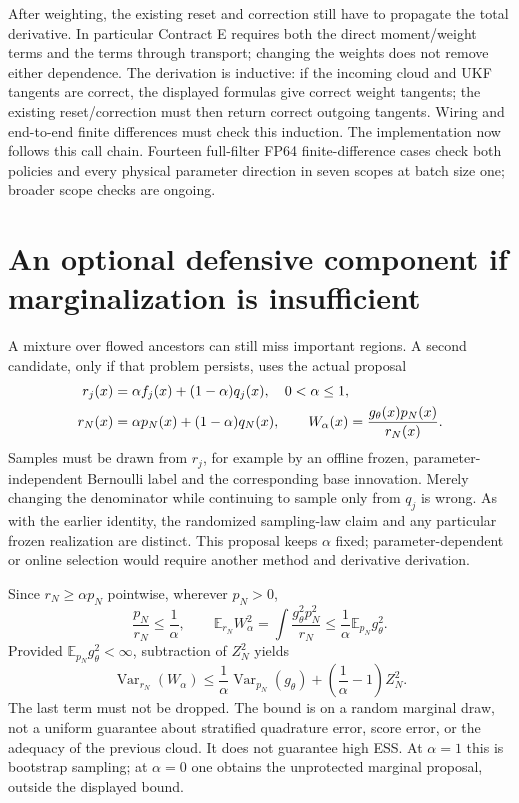 \documentclass[11pt]{article}
\newcommand{\E}{\mathbb E}
\newcommand{\Var}{\operatorname{Var}}
\begin{document}
After weighting, the existing reset and correction still have to propagate
the total derivative. In particular Contract E requires both the direct
moment/weight terms and the terms through transport; changing the weights
does not remove either dependence. The derivation is inductive: if the
incoming cloud and UKF tangents are correct, the displayed formulas give
correct weight tangents; the existing reset/correction must then return
correct outgoing tangents. Wiring and end-to-end finite differences must
check this induction. The implementation now follows this call chain. Fourteen full-filter FP64
finite-difference cases check both policies and every physical parameter
direction in seven scopes at batch size one; broader scope checks are ongoing.

\section{An optional defensive component if marginalization is insufficient}

A mixture over flowed ancestors can still miss important regions. A second
candidate, only if that problem persists, uses the actual proposal
\begin{align}
 r_j(x)&=\alpha f_j(x)+(1-\alpha)q_j(x),\quad 0<\alpha\leq1,\notag\\
 r_N(x)&=\alpha p_N(x)+(1-\alpha)q_N(x),\qquad
 W_\alpha(x)=\frac{g_\theta(x)p_N(x)}{r_N(x)} .
 \label{eq:defensive}
\end{align}
Samples must be drawn from $r_j$, for example by an offline frozen,
parameter-independent Bernoulli label and the corresponding base
innovation. Merely changing the denominator while continuing to sample
only from $q_j$ is wrong. As with the earlier identity, the randomized
sampling-law claim and any particular frozen realization are distinct.
This proposal keeps $\alpha$ fixed; parameter-dependent or online
selection would require another method and derivative derivation.

Since $r_N\geq\alpha p_N$ pointwise, wherever $p_N>0$,
\begin{equation}
 \frac{p_N}{r_N}\leq\frac1\alpha,\qquad
 \E_{r_N}W_\alpha^2
 =\int\frac{g_\theta^2 p_N^2}{r_N}
 \leq\frac1\alpha\E_{p_N}g_\theta^2 .
 \label{eq:defensive-bound}
\end{equation}
Provided $\E_{p_N}g_\theta^2<\infty$, subtraction of $Z_N^2$ yields
\begin{equation}
 \Var_{r_N}(W_\alpha)
 \leq\frac1\alpha\Var_{p_N}(g_\theta)
           +\left(\frac1\alpha-1\right)Z_N^2 .
 \label{eq:defensive-variance}
\end{equation}
The last term must not be dropped. The bound is on a random marginal draw,
not a uniform guarantee about stratified quadrature error, score error,
or the adequacy of the previous cloud. It does not guarantee high ESS.
At $\alpha=1$ this is bootstrap sampling; at $\alpha=0$ one obtains the
unprotected marginal proposal, outside the displayed bound.
\end{document}
